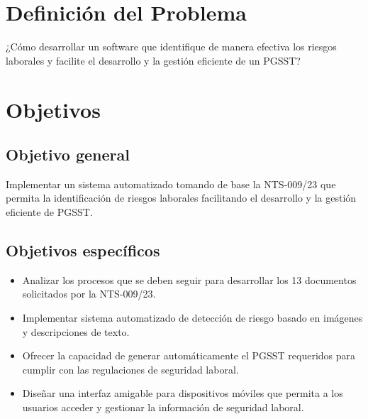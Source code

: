 
\section{Definición del Problema}
¿Cómo desarrollar un software que identifique de manera efectiva los riesgos laborales y facilite el desarrollo y la gestión eficiente de un PGSST?

\section{Objetivos}
\subsection{Objetivo general}
Implementar un sistema automatizado tomando de base la NTS-009/23 que permita la identificación de riesgos laborales facilitando el desarrollo y la gestión eficiente de PGSST.

\subsection{Objetivos específicos}
\begin{itemize}
    \item Analizar los procesos que se deben seguir para desarrollar los 13 documentos solicitados por la NTS-009/23.
    \item Implementar sistema automatizado de detección de riesgo basado en imágenes y descripciones de texto.
    \item Ofrecer la capacidad de generar automáticamente el PGSST requeridos para cumplir con las regulaciones de seguridad laboral.
    \item Diseñar una interfaz amigable para dispositivos móviles que permita a los usuarios acceder y gestionar la información de seguridad laboral.
\end{itemize}

